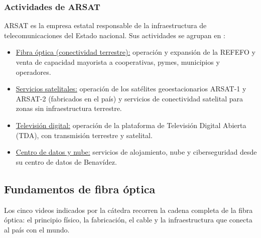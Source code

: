 \subsubsection{Actividades de ARSAT}
ARSAT es la empresa estatal responsable de la infraestructura de telecomunicaciones del Estado nacional. Sus actividades se agrupan en \cite{arsat_refefo, libro_catedra}:
\begin{itemize}
    \item \underline{Fibra óptica (conectividad terrestre):} operación y expansión de la REFEFO y venta de capacidad mayorista a cooperativas, pymes, municipios y operadores.
    \item \underline{Servicios satelitales:} operación de los satélites geoestacionarios ARSAT-1 y ARSAT-2 (fabricados en el país) y servicios de conectividad satelital para zonas sin infraestructura terrestre.
    \item \underline{Televisión digital:} operación de la plataforma de Televisión Digital Abierta (TDA), con transmisión terrestre y satelital.
    \item \underline{Centro de datos y nube:} servicios de alojamiento, nube y ciberseguridad desde su centro de datos de Benavídez.
\end{itemize}

\subsection{Fundamentos de fibra óptica}
\label{sec:fundamentos}
Los cinco videos indicados por la cátedra recorren la cadena completa de la fibra óptica: el principio físico, la fabricación, el cable y la infraestructura que conecta al país con el mundo.

